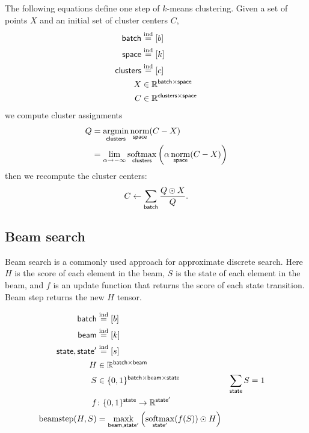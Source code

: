 \documentclass{article}
\newcommand{\reals}{\mathbb{R}}
\begin{document}
The following equations define one step of $k$-means clustering. Given a set of points $X$ and an initial set of cluster centers $C$,
\begin{align*}
\name{batch} &\ndef [b] \\
\name{space} &\ndef [k] \\
\name{clusters} &\ndef [c] \\
  X &\in \reals^{\name{batch} \times \name{space}} \\
C &\in \reals^{\name{clusters} \times \name{space}}
\end{align*}
we compute cluster assignments
\begin{align*}
Q &= \nfun{clusters}{argmin} \nfun{space}{norm}(C-X) \\
  &= \lim_{\alpha \rightarrow -\infty} \nfun{clusters}{softmax} \left(\alpha \nfun{space}{norm}(C-X)\right)
\end{align*}
then we recompute the cluster centers:
\begin{equation*}
C \leftarrow \nsum{batch} \frac{Q \odot X}{Q}.
\end{equation*}

\subsection{Beam search}

Beam search is a commonly used approach for approximate discrete search. Here $H$ is the score of each element in the beam, $S$ is the state of each element in the beam, and $f$ is an update function that returns the score of each state transition. 
Beam step returns the new $H$ tensor. 

\begin{align*} 
\name{batch} &\ndef [b] \\
\name{beam} &\ndef [k] \\
\name{state}, \name{state'} &\ndef [s] \\
H &\in \reals^{{\name{batch} \times \name{beam}}} \\
S &\in \{0, 1\}^{{\name{batch} \times \name{beam} \times \name{state}}} & \nsum{state} S &= 1\\
f &\colon \{0, 1\}^{{\name{state}}} \rightarrow \reals^{{\name{state'}}} \\ 
\text{beamstep}(H, S) &= \nfun{beam, state'}{maxk} \left( \nfun{state'}{softmax}(f(S)) \odot H \right)
\end{align*} 
\end{document}
